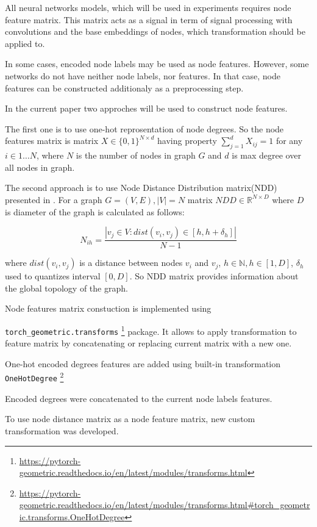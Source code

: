 All neural networks models, which will be used in experiments requires node feature matrix. This matrix
acts as a signal in term of signal processing with convolutions and the base embeddings of nodes,
which transformation should be applied to.

In some cases, encoded node labels may be used as node features. However, some networks
do not have neither node labels, nor features.
In that case, node features can be constructed additionaly as a preprocessing step.

In the current paper two approches will be used to construct node features.

The first one is to use one-hot reprosentation of node degrees. So the node features matrix
is matrix $X \in \{0,1\}^{N \times d}$ having property $\sum_{j=1}^{d}X_{ij} = 1$ for any $i \in 1 \dots N$,
where $N$ is the number of nodes in graph $G$ and $d$ is max degree over all nodes in graph.


The second approach is to use Node Distance Distribution matrix(NDD) presented in \cite{Netpro2vec}.
For a graph $G=(V,E), |V|=N$ matrix $NDD \in \mathbb{R}^{N \times D}$ where $D$ is diameter of the graph is calculated as follows:

\begin{equation}
    N_{ih} = \frac{|v_j \in V : dist(v_i, v_j) \in [h, h + \delta_h]|}{N-1}
    \label{eq:ndd}
\end{equation}

where $dist(v_i, v_j)$ is a distance between nodes $v_i$ and $v_j$, $h \in \mathbb{N}, h \in [1,D]$,
$\delta_h$ used to quantizes interval $[0,D]$. So NDD matrix provides information about the global topology of the graph.


Node features matrix constuction is implemented using

\texttt{torch\_geometric.transforms} \footnote{\url{https://pytorch-geometric.readthedocs.io/en/latest/modules/transforms.html}}
package. It allows to apply transformation to feature matrix by concatenating or replacing current matrix with a new one.

One-hot encoded degrees features are added using built-in transformation \texttt{OneHotDegree}
\footnote{\url{https://pytorch-geometric.readthedocs.io/en/latest/modules/transforms.html\#torch_geometric.transforms.OneHotDegree}}

Encoded degrees were concatenated to the current node labels features.

To use node distance matrix as a node feature matrix, new custom transformation was developed.


